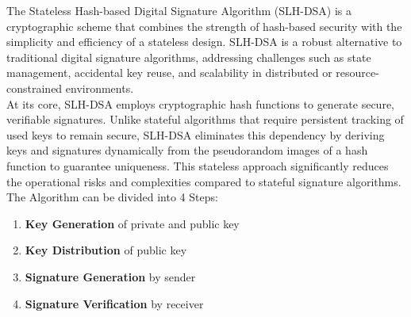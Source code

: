 \documentclass[journal=tosc,notanonymous]{iacrtrans}
\begin{document}
The Stateless Hash-based Digital Signature Algorithm (SLH-DSA) is a cryptographic scheme that combines the strength of hash-based security with the simplicity and efficiency of a stateless design. SLH-DSA is a robust alternative to traditional digital signature algorithms, addressing challenges such as state management, accidental key reuse, and scalability in distributed or resource-constrained environments.
\\
At its core, SLH-DSA employs cryptographic hash functions to generate secure, verifiable signatures. Unlike stateful algorithms that require persistent tracking of used keys to remain secure, SLH-DSA eliminates this dependency by deriving keys and signatures dynamically from the pseudorandom images of a hash function to guarantee uniqueness.
This stateless approach significantly reduces the operational risks and complexities compared to stateful signature algorithms.
\\
The Algorithm can be divided into 4 Steps:
\begin{enumerate}
	\item \textbf{Key Generation} of private and public key
	\item \textbf{Key Distribution} of public key
	\item \textbf{Signature Generation} by sender
	\item \textbf{Signature Verification} by receiver
\end{enumerate}
\end{document}
